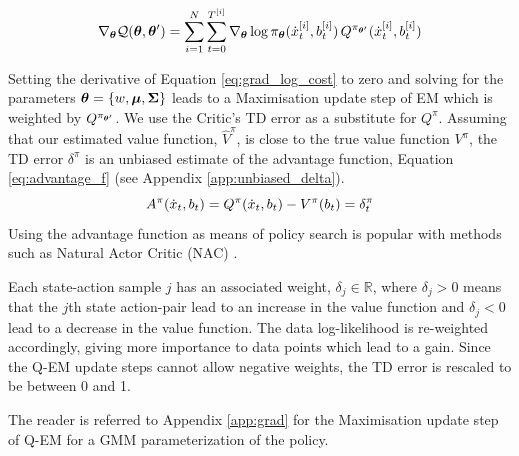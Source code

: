 \begin{equation} \label{eq:grad_log_cost}
  \nabla_{\boldsymbol{\theta}}\mathcal{Q}(\boldsymbol{\theta},\boldsymbol{\theta}') = \sum\limits_{i=1}^{N} \sum\limits_{t=0}^{T^{[i]}} \nabla_{\boldsymbol{\theta}}\log \pi_{\boldsymbol{\theta}}(\dot{x}^{[i]}_t,b^{[i]}_t) \, Q^{\pi_{\boldsymbol{\theta}'}}(\dot{x}^{[i]}_t,b^{[i]}_t)
\end{equation}

Setting the derivative of Equation \ref{eq:grad_log_cost} to zero and solving for the parameters
$\boldsymbol{\theta}=\{w,\boldsymbol{\mu},\boldsymbol{\Sigma}\}$ leads to a Maximisation update step of EM
which is weighted by $Q^{\pi_{\boldsymbol{\theta}'}}$.
We use the Critic's TD error as a substitute for $Q^{\pi}$. Assuming that our estimated value function, $\hat{V}^{\pi}$, 
is close to the true value function $V^{\pi}$, the TD error $\delta^{\pi}$ is an unbiased estimate of the advantage function, Equation \ref{eq:advantage_f} 
(see Appendix \ref{app:unbiased_delta}).
\begin{equation}\label{eq:advantage_f}
 A^{\pi}(\dot{x}_t,b_t) =  Q^{\pi}(\dot{x}_t,b_t) - V^{\pi}(b_t) = \delta^{\pi}_t
\end{equation}
Using the advantage function as means of policy search is popular with methods such as
Natural Actor Critic (NAC) \cite{peter_nac_2008}.

Each state-action sample $j$ has an associated weight, $\delta_j \in \mathbb{R}$, where $\delta_j > 0$ means that the 
$j$th state action-pair lead to an increase in the value function and $\delta_j < 0$ lead to 
a decrease in the value function. The data log-likelihood is re-weighted accordingly, giving more importance to data points which lead to a gain. Since 
the Q-EM update steps cannot allow negative weights, the TD error is rescaled to be between 0 and 1. %

The reader is referred to Appendix \ref{app:grad} for the Maximisation update step of Q-EM for a 
GMM parameterization of the policy.

